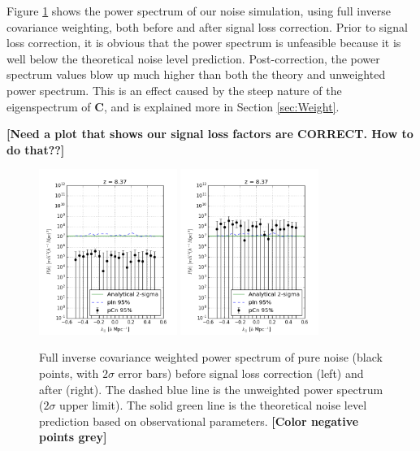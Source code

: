 \documentclass[preprint2,numberedappendix,tighten,twocolappendix]{aastex6}  %
\newcommand{\cc}[1]{{\color{purple} \textbf{[#1]}}}
\begin{document}
Figure \ref{fig:ps1_noise} shows the power spectrum of our noise simulation, using full inverse covariance weighting, both before and after signal loss correction. Prior to signal loss correction, it is obvious that the power spectrum is unfeasible because it is well below the theoretical noise level prediction. Post-correction, the power spectrum values blow up much higher than both the theory and unweighted power spectrum. This is an effect caused by the steep nature of the eigenspectrum of $\textbf{C}$, and is explained more in Section \ref{sec:Weight}.

\cc{Need a plot that shows our signal loss factors are CORRECT. How to do that??}

\begin{figure}
	\centering
	\includegraphics[width=0.4\textwidth]{plots/ps1_noise_nosigloss.png}
	\includegraphics[width=0.4\textwidth]{plots/ps1_noise.png}
	\caption{Full inverse covariance weighted power spectrum of pure noise (black points, with $2\sigma$ error bars) before signal loss correction (left) and after (right). The dashed blue line is the unweighted power spectrum ($2\sigma$ upper limit). The solid green line is the theoretical noise level prediction based on observational parameters. \cc{Color negative points grey}}
	\label{fig:ps1_noise}
\end{figure}
\end{document}

